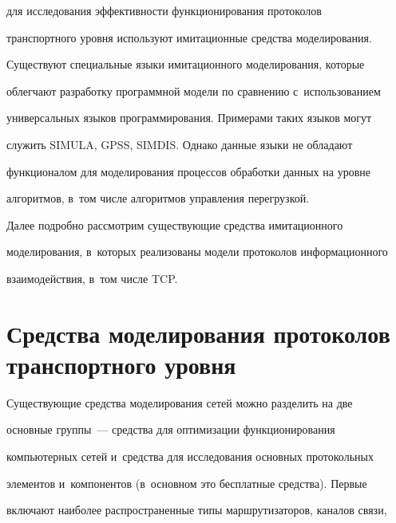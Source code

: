 для исследования эффективности функционирования протоколов


транспортного уровня используют имитационные средства моделирования.





  Существуют специальные языки имитационного моделирования, которые


облегчают разработку программной модели по сравнению с~использованием


универсальных языков программирования. Примерами таких языков могут


служить SIMULA, GPSS, SIMDIS. Однако данные языки не обладают


функционалом для моделирования процессов обработки данных на уровне


алгоритмов, в~том числе алгоритмов управления перегрузкой.





  Далее подробно рассмотрим существующие средства имитационного


моделирования, в~которых реализованы модели протоколов информационного


взаимодействия, в~том числе TCP.










\section{Средства моделирования протоколов транспортного уровня}










  Существующие средства моделирования сетей можно разделить на две


основные группы~--- средства для оптимизации функционирования


компьютерных сетей и~средства для исследования основных протокольных


элементов и~компонентов (в~основном это бесплатные средства). Первые


включают наиболее распространенные типы маршрутизаторов, каналов связи,


